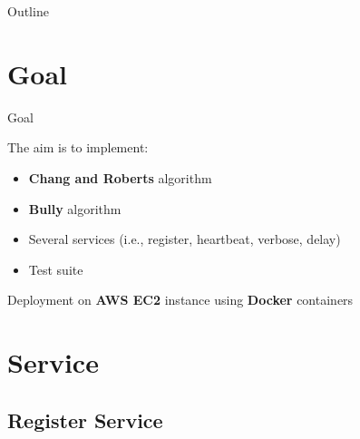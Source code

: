 \documentclass{beamer}
\begin{document}
	\begin{frame}
    \titlepage
    \centering
    \doclicenseIcon
    \end{frame}

	
	\begin{frame}{Outline}
		\tableofcontents
	\end{frame}
	
	\section{Goal}
		    \begin{frame}{Goal}
		    
		    The aim is to implement: 
		    
		    \begin{itemize}
		        \item \textbf{Chang and Roberts} algorithm
		        \item \textbf{Bully} algorithm
		        \item Several services (i.e., register, heartbeat, verbose, delay)
		        \item Test suite
		    \end{itemize}\pause
		    Deployment on \textbf{AWS EC2} instance using \textbf{Docker} containers
		    \end{frame}
		    
	\section{Service}
	    
	    \subsection{Register Service}
	    
\end{document}
